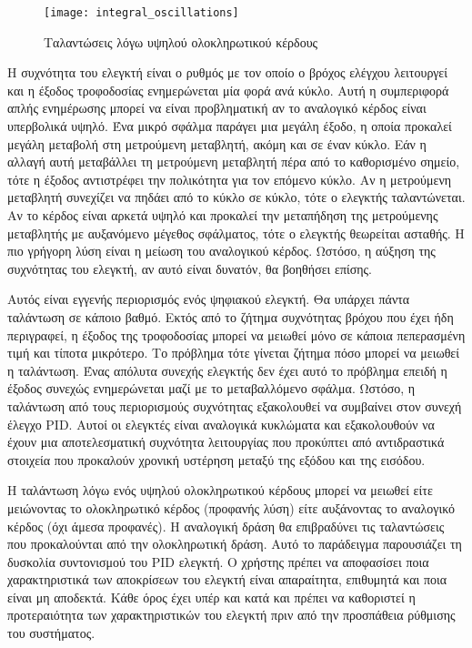 \begin{figure}[h]
  \centering
  \texttt{[image: integral\_oscillations]}
  \caption{Ταλαντώσεις λόγω υψηλού ολοκληρωτικού κέρδους}
  \label{fig:integral_oscillations}
\end{figure}

Η συχνότητα του ελεγκτή είναι ο ρυθμός με τον οποίο ο βρόχος ελέγχου λειτουργεί και η έξοδος τροφοδοσίας ενημερώνεται μία φορά ανά κύκλο. Αυτή η συμπεριφορά απλής ενημέρωσης μπορεί να είναι προβληματική αν το αναλογικό κέρδος είναι υπερβολικά υψηλό. Ένα μικρό σφάλμα παράγει μια μεγάλη έξοδο, η οποία προκαλεί μεγάλη μεταβολή στη μετρούμενη μεταβλητή, ακόμη και σε έναν κύκλο. Εάν η αλλαγή αυτή μεταβάλλει τη μετρούμενη μεταβλητή πέρα από το καθορισμένο σημείο, τότε η έξοδος αντιστρέφει την πολικότητα για τον επόμενο κύκλο. Αν η μετρούμενη μεταβλητή συνεχίζει να πηδάει από το κύκλο σε κύκλο, τότε ο ελεγκτής ταλαντώνεται. Αν το κέρδος είναι αρκετά υψηλό και προκαλεί την μεταπήδηση της μετρούμενης μεταβλητής με αυξανόμενο μέγεθος σφάλματος, τότε ο ελεγκτής θεωρείται ασταθής. Η πιο γρήγορη λύση είναι η μείωση του αναλογικού κέρδος. Ωστόσο, η αύξηση της συχνότητας του ελεγκτή, αν αυτό είναι δυνατόν, θα βοηθήσει επίσης.

Αυτός είναι εγγενής περιορισμός ενός ψηφιακού ελεγκτή. Θα υπάρχει πάντα ταλάντωση σε κάποιο βαθμό. Εκτός από το ζήτημα συχνότητας βρόχου που έχει ήδη περιγραφεί, η έξοδος της τροφοδοσίας μπορεί να μειωθεί μόνο σε κάποια πεπερασμένη τιμή και τίποτα μικρότερο. Το πρόβλημα τότε γίνεται ζήτημα πόσο μπορεί να μειωθεί η ταλάντωση. Ένας απόλυτα συνεχής ελεγκτής δεν έχει αυτό το πρόβλημα επειδή η έξοδος συνεχώς ενημερώνεται μαζί με το μεταβαλλόμενο σφάλμα. Ωστόσο, η ταλάντωση από τους περιορισμούς συχνότητας εξακολουθεί να συμβαίνει στον συνεχή έλεγχο PID. Αυτοί οι ελεγκτές είναι αναλογικά κυκλώματα και εξακολουθούν να έχουν μια αποτελεσματική συχνότητα λειτουργίας που προκύπτει από αντιδραστικά στοιχεία που προκαλούν χρονική υστέρηση μεταξύ της εξόδου και της εισόδου.

Η ταλάντωση λόγω ενός υψηλού ολοκληρωτικού κέρδους μπορεί να μειωθεί είτε μειώνοντας το ολοκληρωτικό κέρδος (προφανής λύση) είτε αυξάνοντας το αναλογικό κέρδος (όχι άμεσα προφανές). Η αναλογική δράση θα επιβραδύνει τις ταλαντώσεις που προκαλούνται από την ολοκληρωτική δράση. Αυτό το παράδειγμα παρουσιάζει τη δυσκολία συντονισμού του PID ελεγκτή. Ο χρήστης πρέπει να αποφασίσει ποια χαρακτηριστικά των αποκρίσεων του ελεγκτή είναι απαραίτητα, επιθυμητά και ποια είναι μη αποδεκτά. Κάθε όρος έχει υπέρ και κατά και πρέπει να καθοριστεί η προτεραιότητα των χαρακτηριστικών του ελεγκτή πριν από την προσπάθεια ρύθμισης του συστήματος.

